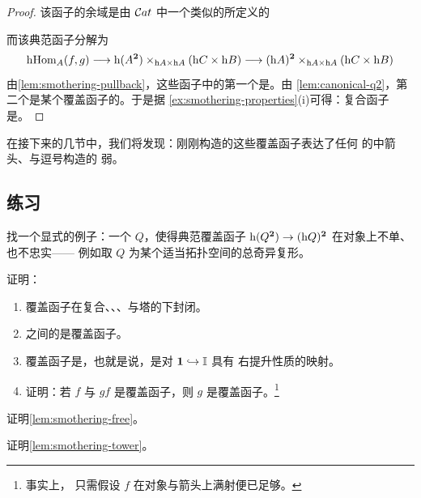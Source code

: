 \begin{proof}
该函子的余域是由 $\mathcal{C}at$ 中一个类似的\trPullback{}所定义的\trCategory
\begin{center}
\end{center}
而该典范函子分解为
\[
\mathrm{h}\mathrm{Hom}_{A}(f,g)\longrightarrow
\mathrm{h}(A^{\mathbf{2}})\times_{\mathrm{h}A\times\mathrm{h}A}(\mathrm{h}C\times\mathrm{h}B)
\longrightarrow
(\mathrm{h}A)^{\mathbf{2}}\times_{\mathrm{h}A\times\mathrm{h}A}(\mathrm{h}C\times\mathrm{h}B)
\]
由\cref{lem:smothering-pullback}，这些函子中的第一个是\trSmothering{}。由%
\cref{lem:canonical-q2}，第二个是某个覆盖函子的\trPullback{}。于是据%
\cref{ex:smothering-properties}(i)可得：复合函子是\trSmothering{}。
\end{proof}

在接下来的几节中，我们将发现：刚刚构造的这些覆盖函子表达了任何%
\trInfinityCosmos{}的\trHomotopyTwoCategory{}中箭头、\trPullback{}与逗号构造的%
弱\trUniversalProperty{}。

\subsection*{练习}

\begin{exercise}\label{ex:smothering-counterexample}
找一个显式的例子：一个\trQuasiCategory{} $Q$，使得典范覆盖函子%
$\mathrm{h}(Q^{\mathbf{2}})\to(\mathrm{h}Q)^{\mathbf{2}}$ 在对象上不单、也不忠实——%
例如取 $Q$ 为某个适当拓扑空间的总奇异复形。
\end{exercise}

\begin{exercise}\label{ex:smothering-properties}
证明：
\begin{enumerate}[label=(\roman*)]
\item 覆盖函子在复合、\trRetract{}、\trProduct{}、\trPullback{}与塔的\trLimit{}下封闭。
\item \trCategory{}之间的\trSurjectiveEquivalence{}是覆盖函子。
\item 覆盖函子是\trIsofibration{}，也就是说，是对 $\mathbf{1}\hookrightarrow\mathbb{I}$ 具有%
右提升性质的映射。
\item 证明：若 $f$ 与 $gf$ 是覆盖函子，则 $g$ 是覆盖函子。\footnote{事实上，%
只需假设 $f$ 在对象与箭头上满射便已足够。}
\end{enumerate}
\end{exercise}

\begin{exercise}\label{ex:smothering-free}
证明\cref{lem:smothering-free}。
\end{exercise}

\begin{exercise}\label{ex:smothering-tower}
证明\cref{lem:smothering-tower}。
\end{exercise}
